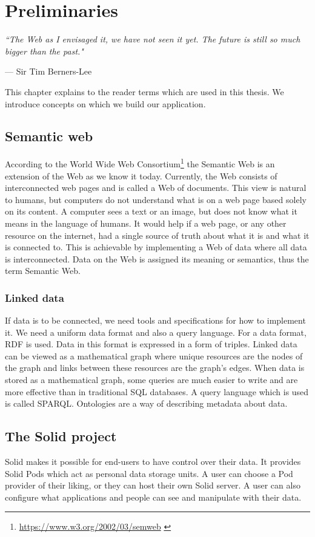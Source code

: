 \setlength{\epigraphwidth}{.5\textwidth}
\setlength\epigraphrule{0pt}

\chapter{Preliminaries}
\epigraph{\textit{``The Web as I envisaged it, we have not seen it yet. The future is still so much bigger than the past."}}{--- Sir Tim Berners-Lee}

This chapter explains to the reader terms which are used in this thesis.
We introduce concepts on which we build our application.

\section{Semantic web}
According to the World Wide Web Consortium\footnote{\url{https://www.w3.org/2002/03/semweb}  \label{fnlabel}} the Semantic Web is an extension of the Web as we know it today.
Currently, the Web consists of interconnected web pages and is called a Web of documents.
This view is natural to humans, but computers do not understand what is on a web page based solely on its content. 
A computer sees a text or an image, but does not know what it means in the language of humans.
It would help if a web page, or any other resource on the internet, had a single source of truth about what it is and what it is connected to.
This is achievable by implementing a Web of data where all data is interconnected.
Data on the Web is assigned its meaning or semantics, thus the term Semantic Web.

\subsection*{Linked data}
If data is to be connected, we need tools and specifications for how to implement it.
We need a uniform data format and also a query language.
For a data format, RDF is used.
Data in this format is expressed in a form of triples.
Linked data can be viewed as a mathematical graph where unique resources are the nodes of the graph and links between these resources are the graph's edges.
When data is stored as a mathematical graph, some queries are much easier to write and are more effective than in traditional SQL databases.
A query language which is used is called SPARQL.
Ontologies are a way of describing metadata about data.

\section{The Solid project}
Solid makes it possible for end-users to have control over their data.
It provides Solid Pods which act as personal data storage units.
A user can choose a Pod provider of their liking, or they can host their own Solid server.
A user can also configure what applications and people can see and manipulate with their data.
